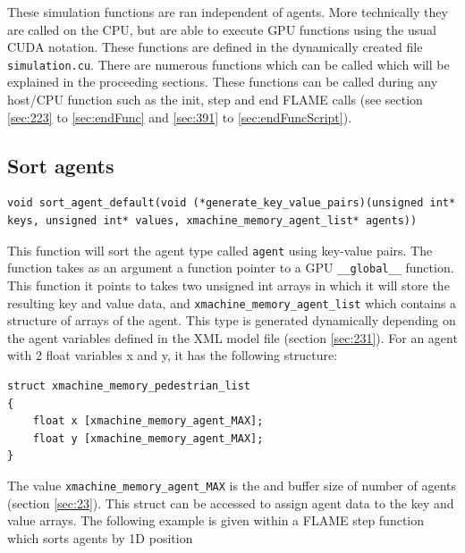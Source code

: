 \documentclass[11pt, a4paper, onecolumn, oneside]{report}
\begin{document}
These simulation functions are ran independent of agents. More technically they are called on the CPU, but are able to execute GPU functions using the usual CUDA notation. These functions are defined in the dynamically created file \verb|simulation.cu|. There are numerous functions which can be called which will be explained in the proceeding sections. These functions can be called during any host/CPU function such as the init, step and end FLAME calls (see section \ref{sec:223} to \ref{sec:endFunc} and \ref{sec:391} to \ref{sec:endFuncScript}).

\subsection{Sort agents}

\begin{lstlisting}[language=C_]
void sort_agent_default(void (*generate_key_value_pairs)(unsigned int* keys, unsigned int* values, xmachine_memory_agent_list* agents))
\end{lstlisting}

This function will sort the agent type called \texttt{agent} using key-value pairs. The function takes as an argument a function pointer to a GPU \texttt{__global__} function. This function it points to takes two unsigned int arrays in which it will store the resulting key and value data, and \texttt{xmachine_memory_agent_list} which contains a structure of arrays of the agent. This type is generated dynamically depending on the agent variables defined in the XML model file (section \ref{sec:231}). For an agent with 2 float variables x and y, it has the following structure:

\begin{lstlisting}[language=C_]
struct xmachine_memory_pedestrian_list 
{	
    float x [xmachine_memory_agent_MAX];
    float y [xmachine_memory_agent_MAX];
}
\end{lstlisting}

The value \texttt{xmachine_memory_agent_MAX} is the and buffer size of number of agents (section \ref{sec:23}). This struct can be accessed to assign agent data to the key and value arrays. The following example is given within a FLAME step function which sorts agents by 1D position
\end{document}
